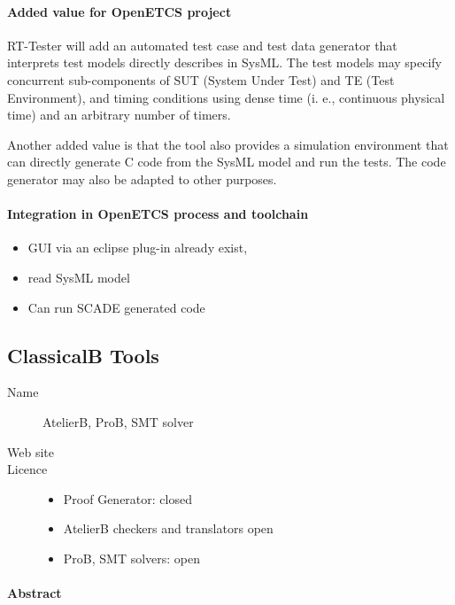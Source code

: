 \paragraph{Added value for OpenETCS project}

RT-Tester will add  an automated test case and test data generator
that interprets test models directly describes in SysML. 
The test models may specify concurrent sub-components of
SUT (System Under Test) and TE (Test Environment), and timing
conditions using dense time (i. e., continuous physical time) and 
an arbitrary number of timers. 

Another added value is that the tool also provides a simulation
environment that can directly generate C code from the SysML model and
run the tests.
The code generator may also be adapted to other purposes.

\paragraph{Integration in OpenETCS process and toolchain}

\begin{itemize}
  \item GUI via an eclipse plug-in already exist,
  \item read SysML model
  \item Can run SCADE generated code
\end{itemize}

\subsection{ClassicalB Tools}
\label{sec:ClassicalB}

\begin{description}
\item[Name] AtelierB, ProB, SMT solver
\item[Web site] 
\item[Licence] 
  \begin{itemize}
    \item Proof Generator:  closed
    \item AtelierB checkers and translators open
    \item ProB, SMT solvers: open
  \end{itemize}
\end{description}

\paragraph{Abstract}

